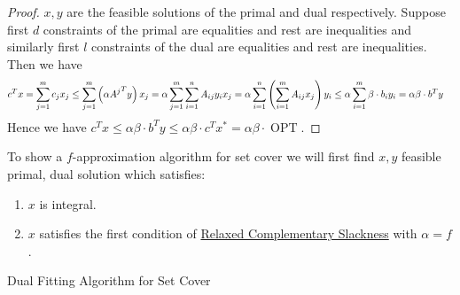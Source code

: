 \begin{proof}
	$x,y$ are the feasible solutions of the primal and dual respectively. Suppose first $d$ constraints of the primal are equalities and rest are inequalities and similarly first $l$ constraints of the dual are equalities and rest are inequalities. Then we have \begin{align*}
        c^Tx & =\sum\limits_{j=1}^m c_jx_j \leq\sum_{j=1}^m \left(\alpha {A^j}^Ty\right)x_j= \alpha\sum_{j=1}^m\sum_{i=1}^n A_{ij}y_ix_j = \alpha\sum_{i=1}^n \left(\sum_{i=1}^m A_{ij}x_j\right)y_i \leq \alpha\sum\limits_{i=1}^m\beta\cdot b_iy_i=\alpha\beta\cdot b^Ty  
    \end{align*}
    Hence we have $c^Tx\leq \alpha\beta\cdot b^Ty\leq \alpha\beta\cdot c^Tx^*=\alpha\beta\cdot \operatorname{OPT}$.
\end{proof}

To show a $f$-approximation algorithm for set cover we will first find $x,y$ feasible primal, dual solution which satisfies:\begin{enumerate}
    \item $x$ is integral.
    \item $x$ satisfies the first condition of \hyperref[th:relaxed-cs]{Relaxed Complementary Slackness} with $\alpha=f$.
\end{enumerate}

\begin{algorithm}
\DontPrintSemicolon
    \caption{Dual Fitting Algorithm for Set Cover}
\end{algorithm}

